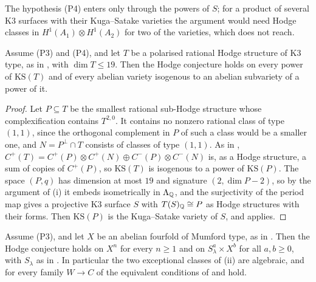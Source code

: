 The hypothesis (P4) enters only through the powers of $S$; for a product of
several K3 surfaces with their Kuga--Satake varieties the argument would need
Hodge classes in $H^{1}(A_{1})\otimes H^{1}(A_{2})$ for two of the
varieties, which  does not reach.

\begin{corollary}\label{cor:kstype}
Assume \textup{(P3)} and \textup{(P4)}, and let $T$ be a polarised rational
Hodge structure of K3 type, as in , with $\dim T\le19$.
Then the Hodge conjecture holds on every power of $\mathrm{KS}(T)$ and of
every abelian variety isogenous to an abelian subvariety of a power of it.
\end{corollary}

\begin{proof}
Let $P\subseteq T$ be the smallest rational sub-Hodge structure whose
complexification contains $T^{2,0}$. It contains no nonzero rational class
of type $(1,1)$, since the orthogonal complement in $P$ of such a class
would be a smaller one, and $N=P^{\perp}\cap T$ consists of classes of type
$(1,1)$. As in ,
$C^{+}(T)=C^{+}(P)\otimes C^{+}(N)\oplus C^{-}(P)\otimes C^{-}(N)$ is, as a
Hodge structure, a sum of copies of $C^{+}(P)$, so $\mathrm{KS}(T)$ is
isogenous to a power of $\mathrm{KS}(P)$. The space $(P,q)$ has dimension at
most $19$ and signature $(2,\dim P-2)$, so by the argument of
(i) it embeds isometrically in $\Lambda_{\mathbb{Q}}$, and the
surjectivity of the period map gives a projective K3 surface $S$ with
$T(S)_{\mathbb{Q}}\cong P$ as Hodge structures with their forms. Then
$\mathrm{KS}(P)$ is the Kuga--Satake variety of $S$, and
 applies.
\end{proof}

\begin{corollary}\label{cor:mumfordall}
Assume \textup{(P3)}, and let $X$ be an abelian fourfold of Mumford type, as
in . Then the Hodge conjecture holds on $X^{n}$ for every
$n\ge1$ and on $S_{\lambda}^{a}\times X^{b}$ for all $a,b\ge0$, with
$S_{\lambda}$ as in . In particular the two exceptional
classes of (ii) are algebraic, and for every family
$W\to C$ of  the equivalent conditions of
 and  hold.
\end{corollary}

